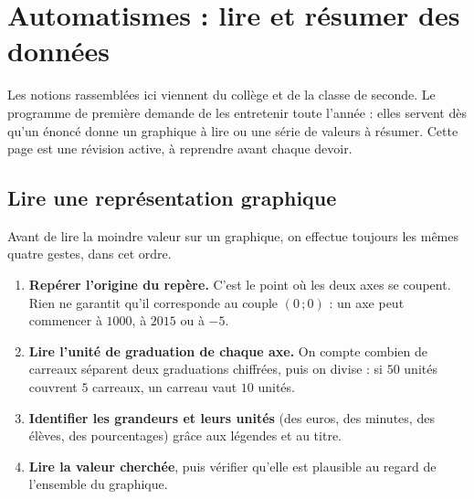 
\chapter*{Automatismes : lire et résumer des données}

Les notions rassemblées ici viennent du collège et de la classe de seconde. Le
programme de première demande de les entretenir toute l'année : elles servent dès
qu'un énoncé donne un graphique à lire ou une série de valeurs à résumer. Cette
page est une révision active, à reprendre avant chaque devoir.

\section*{Lire une représentation graphique}

Avant de lire la moindre valeur sur un graphique, on effectue toujours les mêmes
quatre gestes, dans cet ordre.

\begin{enumerate}
  \item \textbf{Repérer l'origine du repère.} C'est le point où les deux axes se
    coupent. Rien ne garantit qu'il corresponde au couple $(0\,;0)$ : un axe peut
    commencer à $1000$, à $2015$ ou à $-5$.
  \item \textbf{Lire l'unité de graduation de chaque axe.} On compte combien de
    carreaux séparent deux graduations chiffrées, puis on divise : si $50$ unités
    couvrent $5$ carreaux, un carreau vaut $10$ unités.
  \item \textbf{Identifier les grandeurs et leurs unités} (des euros, des minutes,
    des élèves, des pourcentages) grâce aux légendes et au titre.
  \item \textbf{Lire la valeur cherchée}, puis vérifier qu'elle est plausible au
    regard de l'ensemble du graphique.
\end{enumerate}


